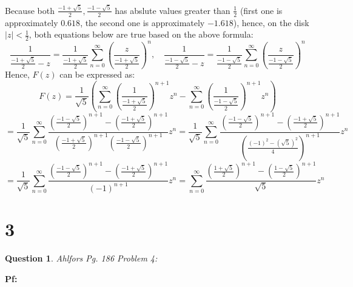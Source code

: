 \documentclass{article}
\newtheorem{question}{Question}
\begin{document}
Because both $\frac{-1+\sqrt{5}}{2},\frac{-1-\sqrt{5}}{2}$ has abslute values greater than $\frac{1}{2}$ (first one is approximately $0.618$, the second one is approximately $-1.618$),
hence, on the disk $|z|<\frac{1}{2}$, both equations below are true based on the above formula:
$$\frac{1}{\frac{-1+\sqrt{5}}{2}-z}=\frac{1}{\frac{-1+\sqrt{5}}{2}}\sum_{n=0}^{\infty}\left(\frac{z}{\frac{-1+\sqrt{5}}{2}}\right)^n,\quad \frac{1}{\frac{-1-\sqrt{5}}{2}-z}=\frac{1}{\frac{-1-\sqrt{5}}{2}}\sum_{n=0}^{\infty}\left(\frac{z}{\frac{-1-\sqrt{5}}{2}}\right)^n$$
Hence, $F(z)$ can be expressed as:
$$F(z)=\frac{1}{\sqrt{5}}\left(\sum_{n=0}^{\infty}\left(\frac{1}{\frac{-1+\sqrt{5}}{2}}\right)^{n+1}z^n-\sum_{n=0}^{\infty}\left(\frac{1}{\frac{-1-\sqrt{5}}{2}}\right)^{n+1}z^n\right)$$
$$=\frac{1}{\sqrt{5}}\sum_{n=0}^{\infty}\frac{\left(\frac{-1-\sqrt{5}}{2}\right)^{n+1}-\left(\frac{-1+\sqrt{5}}{2}\right)^{n+1}}{\left(\frac{-1+\sqrt{5}}{2}\right)^{n+1}\left(\frac{-1-\sqrt{5}}{2}\right)^{n+1}}z^n =\frac{1}{\sqrt{5}}\sum_{n=0}^{\infty}\frac{\left(\frac{-1-\sqrt{5}}{2}\right)^{n+1}-\left(\frac{-1+\sqrt{5}}{2}\right)^{n+1}}{\left(\frac{(-1)^2-(\sqrt{5})^2}{4}\right)^{n+1}}z^n$$
$$=\frac{1}{\sqrt{5}}\sum_{n=0}^{\infty}\frac{\left(\frac{-1-\sqrt{5}}{2}\right)^{n+1}-\left(\frac{-1+\sqrt{5}}{2}\right)^{n+1}}{(-1)^{n+1}}z^n = \sum_{n=0}^{\infty}\frac{\left(\frac{1+\sqrt{5}}{2}\right)^{n+1}-\left(\frac{1-\sqrt{5}}{2}\right)^{n+1}}{\sqrt{5}}z^n$$

\break

\section*{3}
\begin{myBox}[]{}
    \begin{question}
        Ahlfors Pg. 186 Problem 4:
    \end{question}
\end{myBox}

\textbf{Pf:}
\end{document}
